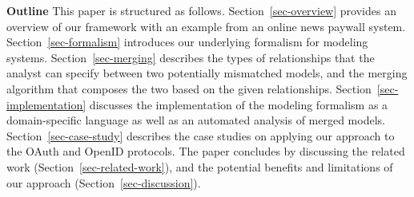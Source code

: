 \textbf{Outline} This paper is structured as
follows. Section~\ref{sec-overview} provides an overview of our
framework with an example from an online news paywall system.
Section~\ref{sec-formalism} introduces our underlying formalism for
modeling systems. Section~\ref{sec-merging} describes the types of
relationships that the analyst can specify between two potentially
mismatched models, and the merging algorithm that composes the two
based on the given relationships. Section~\ref{sec-implementation}
discusses the implementation of the modeling formalism as a
domain-specific language as well as an automated analysis of merged
models. Section~\ref{sec-case-study} describes the case studies on
applying our approach to the OAuth and OpenID protocols. The paper
concludes by discussing the related work
(Section~\ref{sec-related-work}), and the potential benefits and
limitations of our approach (Section~\ref{sec-discussion}).

